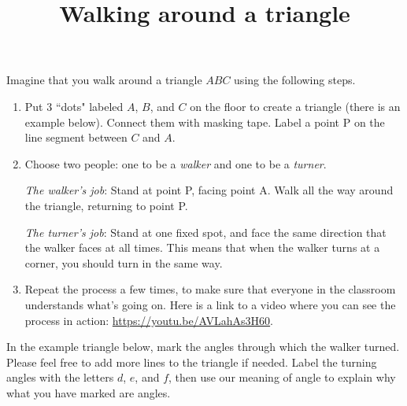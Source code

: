 \documentclass[nooutcomes, noauthor]{ximera}
\title{Walking around a triangle}
\begin{document}
\begin{abstract}
\end{abstract}
\maketitle

Imagine that you walk around a triangle $ABC$ using the following steps.

\begin{enumerate}
\item Put 3 ``dots" labeled $A$, $B$, and $C$ on the floor to create a triangle (there is an example below).  Connect them with masking tape.  Label a point P on the line segment between $C$ and $A$.

\item Choose two people: one to be a \emph{walker} and one to be a \emph{turner}.

\emph{The walker's job}:  Stand at point P, facing point A.  Walk all the way around the triangle, returning to point P.

\emph{The turner's job}:  Stand at one fixed spot, and face the same direction that the walker faces at all times.  This means that when the walker turns at a corner, you should turn in the same way.

\item Repeat the process a few times, to make sure that everyone in the classroom understands what's going on. Here is a link to a video where you can see the process in action: \url{https://youtu.be/AVLahAs3H60}.
\end{enumerate}



\begin{problem}
In the example triangle below, mark the angles through which the walker turned. Please feel free to add more lines to the triangle if needed. Label the turning angles with the letters $d$, $e$, and $f$, then use our meaning of angle to explain why what you have marked are angles.
\vfill
\begin{image}
\end{image}
\vfill
\end{problem}
\end{document}
